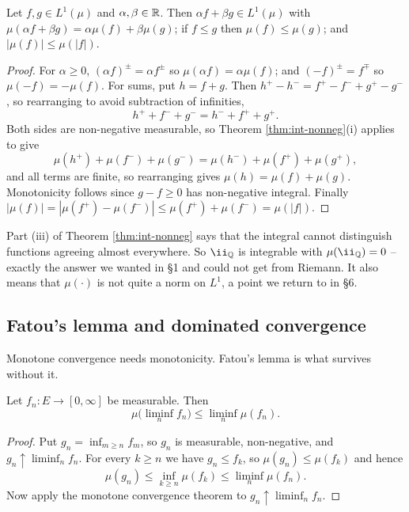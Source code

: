 \documentclass[a4paper]{scrartcl}
\newcommand{\ind}{\ii}
\begin{document}
\begin{theorem}\label{thm:int-gen}
	Let $f, g \in L^1(\mu)$ and $\alpha,\beta \in \mathbb{R}$. Then $\alpha f + \beta g \in L^1(\mu)$ with $\mu(\alpha f + \beta g) = \alpha \mu(f)+\beta\mu(g)$; if $f \leq g$ then $\mu(f) \leq \mu(g)$; and $|\mu(f)| \leq \mu(|f|)$.
\end{theorem}
\begin{proof}
	For $\alpha \geq 0$, $(\alpha f)^\pm = \alpha f^\pm$ so $\mu(\alpha f) = \alpha\mu(f)$; and $(-f)^\pm = f^\mp$ so $\mu(-f) = -\mu(f)$. For sums, put $h = f+g$. Then $h^+ - h^- = f^+ - f^- + g^+ - g^-$, so rearranging to avoid subtraction of infinities,
	$$
	h^+ + f^- + g^- = h^- + f^+ + g^+.
	$$
	Both sides are non-negative measurable, so Theorem \ref{thm:int-nonneg}(i) applies to give
	$$
	\mu(h^+)+\mu(f^-)+\mu(g^-) = \mu(h^-)+\mu(f^+)+\mu(g^+),
	$$
	and all terms are finite, so rearranging gives $\mu(h) = \mu(f)+\mu(g)$. Monotonicity follows since $g - f \geq 0$ has non-negative integral. Finally $|\mu(f)| = |\mu(f^+)-\mu(f^-)| \leq \mu(f^+)+\mu(f^-) = \mu(|f|)$.
\end{proof}

\begin{remark}
	Part (iii) of Theorem \ref{thm:int-nonneg} says that the integral cannot distinguish functions agreeing almost everywhere. So $\ind_\Q$ is integrable with $\mu(\ind_\Q) = 0$ -- exactly the answer we wanted in \S1 and could not get from Riemann. It also means that $\mu(\cdot)$ is not quite a norm on $L^1$, a point we return to in \S6.
\end{remark}

\subsection{Fatou's lemma and dominated convergence}

Monotone convergence needs monotonicity. Fatou's lemma is what survives without it.

\begin{lemma}[Fatou]\label{lem:fatou}
	Let $f_n : E \to [0,\infty]$ be measurable. Then
	$$
	\mu\big( \liminf_n f_n \big) \leq \liminf_n \mu(f_n).
	$$
\end{lemma}
\begin{proof}
	Put $g_n = \inf_{m\geq n} f_m$, so $g_n$ is measurable, non-negative, and $g_n \uparrow \liminf_n f_n$. For every $k \geq n$ we have $g_n \leq f_k$, so $\mu(g_n) \leq \mu(f_k)$ and hence
	$$
	\mu(g_n) \leq \inf_{k \geq n}\mu(f_k) \leq \liminf_n \mu(f_n).
	$$
	Now apply the monotone convergence theorem to $g_n \uparrow \liminf_n f_n$.
\end{proof}
\end{document}
